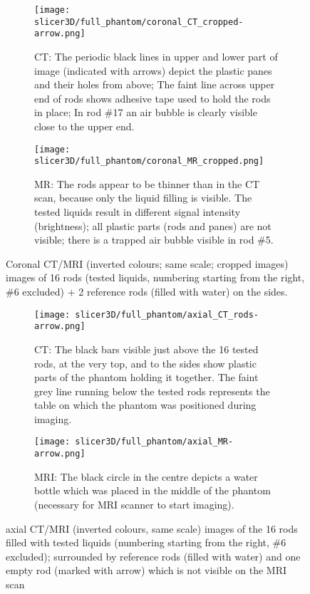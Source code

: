 \begin{figure}[!tbp]
  \begin{subfigure}[b]{\textwidth}
    \texttt{[image: slicer3D/full\_phantom/coronal\_CT\_cropped-arrow.png]}
    \caption{CT: The periodic black lines in upper and lower part of image (indicated with arrows) depict the plastic panes and their holes from above; The faint line across upper end of rods shows adhesive tape used to hold the rods in place; In rod \#17 an air bubble is clearly visible close to the upper end.}
    \label{fig:coronal_CT}
  \end{subfigure}
  \begin{subfigure}[b]{1\textwidth}
    \texttt{[image: slicer3D/full\_phantom/coronal\_MR\_cropped.png]}
    \caption{MR: The rods appear to be thinner than in the CT scan, because only the liquid filling is visible. The tested liquids result in different signal intensity (brightness); all plastic parts (rods and panes) are not visible; there is a trapped air bubble visible in rod \#5.}
    \label{fig:coronal_MR}
  \end{subfigure}
  \caption{Coronal CT/MRI (inverted colours; same scale; cropped images) images of 16 rods (tested liquids, numbering starting from the right, \#6 excluded) + 2 reference rods (filled with water) on the sides.}
  \label{fig:coronal}
\end{figure}

\begin{figure}[!tbp]
  \begin{subfigure}[b]{\textwidth}
    \texttt{[image: slicer3D/full\_phantom/axial\_CT\_rods-arrow.png]}
    \caption{CT: The black bars visible just above the 16 tested rods, at the very top, and to the sides show plastic parts of the phantom holding it together. The faint grey line running below the tested rods represents the table on which the phantom was positioned during imaging.}
    \label{fig:axial_CT_rods}
  \end{subfigure}
  \begin{subfigure}[b]{\textwidth}
    \texttt{[image: slicer3D/full\_phantom/axial\_MR-arrow.png]}
    \caption{MRI: The black circle in the centre depicts a water bottle which was placed in the middle of the phantom (necessary for MRI scanner to start imaging).}
    \label{fig:axial_MR}
  \end{subfigure}
  \caption{axial CT/MRI (inverted colours, same scale) images of the 16 rods filled with tested liquids (numbering starting from the right, \#6 excluded); surrounded by reference rods (filled with water) and one empty rod (marked with arrow) which is not visible on the MRI scan}
  \label{fig:axial}
\end{figure}


